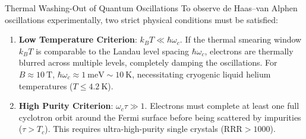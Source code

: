 \documentclass[11pt,a4paper]{article}
\begin{document}
\begin{pitfallbox}{Thermal Washing-Out of Quantum Oscillations}
To observe de Haas--van Alphen oscillations experimentally, two strict physical conditions must be satisfied:
\begin{enumerate}
    \item \textbf{Low Temperature Criterion}: $k_B T \ll \hbar\omega_c$. If the thermal smearing window $k_B T$ is comparable to the Landau level spacing $\hbar\omega_c$, electrons are thermally blurred across multiple levels, completely damping the oscillations. For $B \approx 10\ \mathrm{T}$, $\hbar\omega_c \approx 1\ \mathrm{meV} \sim 10\ \mathrm{K}$, necessitating cryogenic liquid helium temperatures ($T \le 4.2\ \mathrm{K}$).
    \item \textbf{High Purity Criterion}: $\omega_c \tau \gg 1$. Electrons must complete at least one full cyclotron orbit around the Fermi surface before being scattered by impurities ($\tau > T_c$). This requires ultra-high-purity single crystals ($\mathrm{RRR} > 1000$).
\end{enumerate}
\end{pitfallbox}

\vspace{0.4cm}
\end{document}
